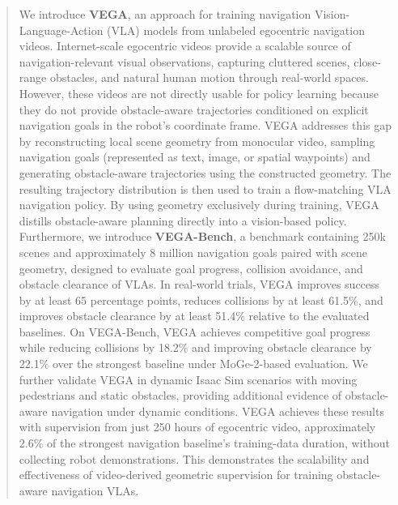 \begin{abstract}
We introduce \textbf{VEGA}, an approach for training navigation Vision-Language-Action (VLA) models from unlabeled egocentric navigation videos.
Internet-scale egocentric videos provide a scalable source of navigation-relevant visual observations, capturing cluttered scenes, close-range obstacles, and natural human motion through real-world spaces.
However, these videos are not directly usable for policy learning because they do not provide obstacle-aware trajectories conditioned on explicit navigation goals in the robot's coordinate frame.
VEGA addresses this gap by reconstructing local scene geometry from monocular video, sampling navigation goals (represented as text, image, or spatial waypoints) and generating obstacle-aware trajectories using the constructed geometry.
The resulting trajectory distribution is then used to train a flow-matching VLA navigation policy.
By using geometry exclusively during training, VEGA distills obstacle-aware planning directly into a vision-based policy. 
Furthermore, we introduce \textbf{VEGA-Bench}, a benchmark containing 250k scenes and approximately 8 million navigation goals paired with scene geometry, designed to evaluate goal progress, collision avoidance, and obstacle clearance of VLAs. 
In real-world trials, VEGA improves success by at least 65 percentage points, reduces collisions by at least 61.5\%, and improves obstacle clearance by at least 51.4\% relative to the evaluated baselines.
On VEGA-Bench, VEGA achieves competitive goal progress while reducing collisions by 18.2\% and improving obstacle clearance by 22.1\% over the strongest baseline under MoGe-2-based evaluation.
We further validate VEGA in dynamic Isaac Sim scenarios with moving pedestrians and static obstacles, providing additional evidence of obstacle-aware navigation under dynamic conditions.
VEGA achieves these results with supervision from just 250 hours of egocentric video, approximately 2.6\% of the strongest navigation baseline's training-data duration, without collecting robot demonstrations.
This demonstrates the scalability and effectiveness of video-derived geometric supervision for training obstacle-aware navigation VLAs.
\end{abstract}


\vspace{-2ex}

